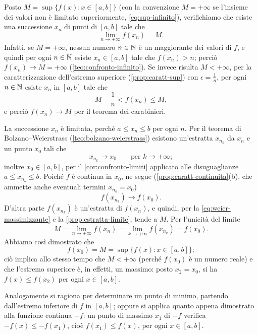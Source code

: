 \begin{dimostrazione}
Posto $M=\sup\{f(x) : x\in[a,b]\}$ (con la convenzione $M=+\infty$ se l'insieme dei
valori non è limitato superiormente, \eqref{eq:sup-infinito}), verifichiamo che esiste
una successione $x_{n}$ di punti di $[a,b]$ tale che
\begin{equation}\label{eq:weier-massimizzante}
  \lim_{n\to+\infty}f(x_{n})=M .
\end{equation}
Infatti, se $M=+\infty$, nessun numero $n\in\mathbb{N}$ è un maggiorante dei valori di $f$, e
quindi per ogni $n\in\mathbb{N}$ esiste $x_{n}\in[a,b]$ tale che $f(x_{n})>n$; perciò
$f(x_{n})\to M=+\infty$ (\cref{teo:confronto-infinito}). Se invece risulta $M<+\infty$,
per la caratterizzazione dell'estremo superiore (\cref{prop:caratt-sup}) con
$\epsilon=\frac1n$, per ogni $n\in\mathbb{N}$ esiste $x_{n}$ in $[a,b]$ tale che
\begin{equation}\label{eq:weier-stima}
  M-\frac1n<f(x_{n})\le M,
\end{equation}
e perciò $f(x_{n})\to M$ per il teorema dei carabinieri.

La successione $x_{n}$ è limitata, perché $a\le x_{n}\le b$ per ogni $n$. Per il teorema
di Bolzano--Weierstrass (\cref{teo:bolzano-weierstrass}) esistono un'estratta $x_{n_{k}}$
da $x_{n}$ e un punto $x_{0}$ tali che
\begin{equation}\label{eq:weier-estratta}
  x_{n_{k}}\to x_{0} \qquad\text{per } k\to+\infty ;
\end{equation}
inoltre $x_{0}\in[a,b]$, per il \cref{cor:confronto-limiti} applicato alle disuguaglianze
$a\le x_{n_{k}}\le b$. Poiché $f$ è continua in $x_{0}$, ne segue
(\cref{prop:caratt-continuita}(b), che ammette anche eventuali termini $x_{n_{k}}=x_{0}$)
\begin{equation}\label{eq:weier-continuita}
  f(x_{n_{k}})\to f(x_{0}) .
\end{equation}
D'altra parte $f(x_{n_{k}})$ è un'estratta di $f(x_{n})$, e quindi, per la
\eqref{eq:weier-massimizzante} e la \cref{prop:estratta-limite}, tende a $M$. Per
l'unicità del limite
\begin{equation}\label{eq:weier-uguaglianza}
  M=\lim_{n\to+\infty}f(x_{n})=\lim_{k\to+\infty}f(x_{n_{k}})=f(x_{0}) .
\end{equation}
Abbiamo così dimostrato che
\begin{equation}\label{eq:weier-tesi}
  f(x_{0})=M=\sup\{f(x) : x\in[a,b]\};
\end{equation}
ciò implica allo stesso tempo che $M<+\infty$ (perché $f(x_{0})$ è un numero reale) e
che l'estremo superiore è, in effetti, un massimo: posto $x_{2}=x_{0}$, si ha
$f(x)\le f(x_{2})$ per ogni $x\in[a,b]$.

Analogamente si ragiona per determinare un punto di minimo, partendo dall'estremo
inferiore di $f$ in $[a,b]$; oppure si applica quanto appena dimostrato alla funzione
continua $-f$: un punto di massimo $x_{1}$ di $-f$ verifica $-f(x)\le-f(x_{1})$, cioè
$f(x_{1})\le f(x)$, per ogni $x\in[a,b]$.
\end{dimostrazione}

